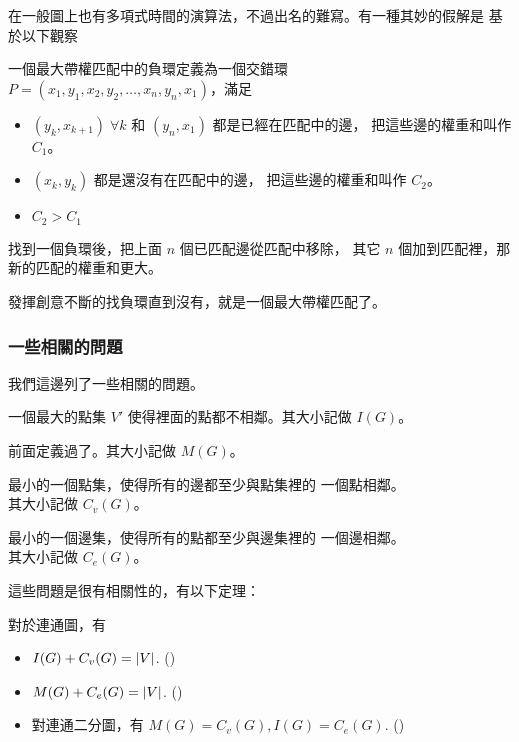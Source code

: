 \documentclass[a4paper,12pt]{book}
\begin{document}
在一般圖上也有多項式時間的演算法，不過出名的難寫。有一種其妙的假解是
基於以下觀察
\begin{theorem}[定義]
  一個最大帶權匹配中的負環定義為一個交錯環\\
  $P = (x_1, y_1, x_2, y_2, \dots, x_n, y_n, x_1)$，滿足
  \begin{itemize}
    \item $(y_k, x_{k+1}) \; \forall k$ 和 $(y_n, x_1)$ 都是已經在匹配中的邊，
      把這些邊的權重和叫作 $C_1$。
    \item $(x_k, y_{k})$ 都是還沒有在匹配中的邊，
      把這些邊的權重和叫作 $C_2$。
    \item $C_2 > C_1$
  \end{itemize}
  找到一個負環後，把上面 $n$ 個已匹配邊從匹配中移除，
  其它 $n$ 個加到匹配裡，那新的匹配的權重和更大。
\end{theorem}
發揮創意不斷的找負環直到沒有，就是一個最大帶權匹配了。

\subsubsection{一些相關的問題}
我們這邊列了一些相關的問題。
\begin{description}[leftmargin=*]
  \item[最大獨立點集] 一個最大的點集 $V'$ 使得裡面的點都不相鄰。其大小記做 $I(G)$。
  \item[最大匹配數] 前面定義過了。其大小記做 $M(G)$。
  \item[最小點覆蓋] 最小的一個點集，使得所有的邊都至少與點集裡的
    一個點相鄰。\\其大小記做 $C_v(G)$。
  \item[最小邊覆蓋] 最小的一個邊集，使得所有的點都至少與邊集裡的
    一個邊相鄰。\\其大小記做 $C_e(G)$。
\end{description}
這些問題是很有相關性的，有以下定理：
\begin{theorem}
  對於連通圖，有
  \begin{itemize}
      \item $I(G) + C_v(G) = \lvert V \rvert$. 
         \hfill{}(\theequation)\label{eq:m1}
      \item $M(G) + C_e(G) = \lvert V \rvert$.
         \hfill{}(\theequation)\label{eq:m2}
      \item 對連通二分圖，有 $M(G) = C_v(G), I(G) = C_e(G)$.
         \hfill{}(\theequation)\label{eq:m3}
  \end{itemize}
\end{theorem}
\end{document}
